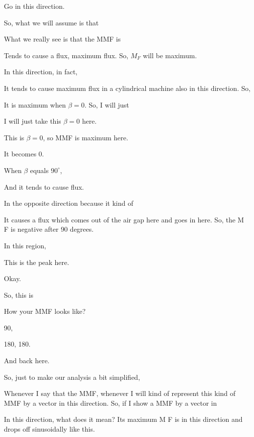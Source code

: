 \documentclass{article}
\begin{document}
Go in this direction.

So, what we will assume is that

What we really see is that the MMF is

Tends to cause a flux, maximum flux. So, $M_F$ will be maximum.

In this direction, in fact,

It tends to cause maximum flux in a cylindrical machine also in this direction. So,

It is maximum when $\beta = 0$. So, I will just

I will just take this $\beta = 0$ here.

This is $\beta = 0$, so MMF is maximum here.

It becomes 0.

When $\beta$ equals $90^\circ$,

And it tends to cause flux.

In the opposite direction because it kind of

It causes a flux which comes out of the air gap here and goes in here. So, the M F is negative after 90 degrees.

In this region,

This is the peak here.



Okay.

So, this is

How your MMF looks like?



90,

180, 180.

And back here.

So, just to make our analysis a bit simplified,

Whenever I say that the MMF, whenever I will kind of represent this kind of MMF by a vector in this direction. So, if I show a MMF by a vector in

In this direction, what does it mean? Its maximum M F is in this direction and drops off sinusoidally like this.
\end{document}
